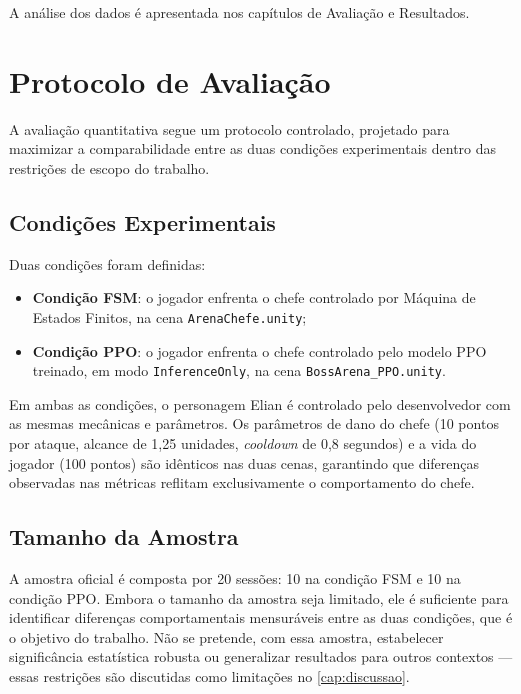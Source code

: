 A análise dos dados é apresentada nos capítulos de Avaliação e Resultados.

\section{Protocolo de Avaliação}
\label{sec:protocolo-avaliacao}

A avaliação quantitativa segue um protocolo controlado, projetado para
maximizar a comparabilidade entre as duas condições experimentais dentro das
restrições de escopo do trabalho.

\subsection{Condições Experimentais}
\label{subsec:condicoes}

Duas condições foram definidas:

\begin{itemize}
    \item \textbf{Condição FSM}: o jogador enfrenta o chefe controlado por
          Máquina de Estados Finitos, na cena \texttt{ArenaChefe.unity};
    \item \textbf{Condição PPO}: o jogador enfrenta o chefe controlado pelo
          modelo PPO treinado, em modo \texttt{InferenceOnly}, na cena
          \texttt{BossArena\_PPO.unity}.
\end{itemize}

Em ambas as condições, o personagem Elian é controlado pelo desenvolvedor com
as mesmas mecânicas e parâmetros. Os parâmetros de dano do chefe (10 pontos
por ataque, alcance de 1,25 unidades, \textit{cooldown} de 0,8 segundos)
e a vida do jogador (100 pontos) são idênticos nas duas cenas, garantindo
que diferenças observadas nas métricas reflitam exclusivamente o
comportamento do chefe.

\subsection{Tamanho da Amostra}
\label{subsec:amostra}

A amostra oficial é composta por 20 sessões: 10 na condição FSM e 10 na
condição PPO. Embora o tamanho da amostra seja limitado, ele é suficiente para
identificar diferenças comportamentais mensuráveis entre as duas condições,
que é o objetivo do trabalho. Não se pretende, com essa amostra, estabelecer
significância estatística robusta ou generalizar resultados para outros
contextos --- essas restrições são discutidas como limitações no
\autoref{cap:discussao}.

